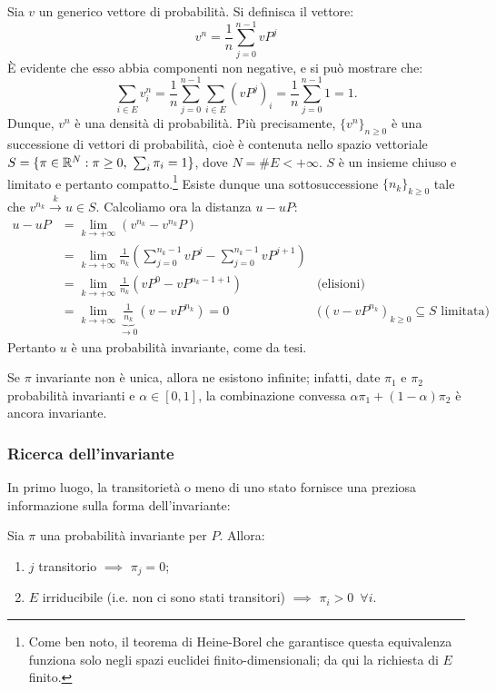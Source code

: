 \begin{dimo}
	Sia $v$ un generico vettore di probabilità.
	Si definisca il vettore:
	$$v^n = \frac 1 n \sum_{j=0}^{n-1} v P^j$$
	È evidente che esso abbia componenti non negative, e si può mostrare che:
	$$\sum_{i \in E} v_i^n = \frac 1 n \sum_{j=0}^{n-1} \sum_{i \in E} (vP^j)_i = \frac 1 n \sum_{j=0}^{n-1} 1 = 1.$$
	Dunque, $v^n$ è una densità di probabilità.
	Più precisamente, $\{v^n\}_{n \ge 0}$ è una successione di vettori di probabilità, cioè è contenuta nello spazio vettoriale
	$S = \{ \pi \in \mathbb R^N : \pi \ge 0, \ \sum_i \pi_i = 1 \}$, dove $N = \#E < +\infty$.
	$S$ è un insieme chiuso e limitato e pertanto compatto.\footnote{Come ben noto, il teorema di Heine-Borel che garantisce questa equivalenza funziona solo negli spazi euclidei finito-dimensionali; da qui la richiesta di $E$ finito.}
	Esiste dunque una sottosuccessione $\{n_k\}_{k \ge 0}$ tale che $v^{n_k} \xrightarrow{k} u \in S$.
	Calcoliamo ora la distanza $u-uP$:
	\begin{align*}
		u-uP &= \lim\limits_{k \to +\infty} \left(v^{n_k} - v^{n_k} P \right) \\
		&= \lim\limits_{k \to +\infty} \frac{1}{n_k}\left( \sum_{j=0}^{n_k-1} v P^j - \sum_{j=0}^{n_k-1} v P^{j+1} \right) \\
		&= \lim\limits_{k \to +\infty} \frac{1}{n_k}\left( v P^0 - v P^{n_k-1+1} \right) &\text{(elisioni)}\\
		&= \lim\limits_{k \to +\infty} \underbrace{\frac{1}{n_k}}_{\to 0} (v-vP^{n_k}) = 0 &\text{($(v-vP^{n_k})_{k\ge 0} \subseteq S$ limitata)}
	\end{align*}
	Pertanto $u$ è una probabilità invariante, come da tesi.
\end{dimo}

\begin{oss}
	Se $\pi$ invariante non è unica, allora ne esistono infinite; infatti, date $\pi_1$ e $\pi_2$
	probabilità invarianti e $\alpha \in [0,1]$, la combinazione convessa $\alpha \pi_1 + (1-\alpha) \pi_2$ è ancora invariante.
\end{oss}
\subsubsection{Ricerca dell'invariante}
In primo luogo, la transitorietà o meno di uno stato fornisce una preziosa informazione sulla forma dell'invariante:
\begin{prop}
	Sia $\pi$ una probabilità invariante per $P$. Allora:
	\begin{enumerate}
		\item $j$ transitorio $\implies$ $\pi_j = 0$;
		\item $E$ irriducibile (i.e. non ci sono stati transitori) $\implies$ $\pi_i > 0 \enspace \forall i$.
	\end{enumerate}
\end{prop}

